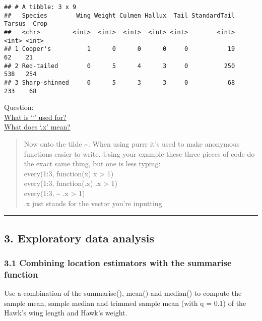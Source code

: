 \documentclass[
]{article}
\begin{document}
\begin{verbatim}
## # A tibble: 3 x 9
##   Species        Wing Weight Culmen Hallux  Tail StandardTail Tarsus  Crop
##   <chr>         <int>  <int>  <int>  <int> <int>        <int>  <int> <int>
## 1 Cooper's          1      0      0      0     0           19     62    21
## 2 Red-tailed        0      5      4      3     0          250    538   254
## 3 Sharp-shinned     0      5      3      3     0           68    233    68
\end{verbatim}

Question:\\
\href{https://purrr.tidyverse.org/articles/other-langs.html}{What is ``'
used for?}\\
\href{https://www.reddit.com/r/Rlanguage/comments/hcp4j7/what_does_x_and_p_mean_when_writing_functions/}{What
does `.x' mean?}

\begin{quote}
Now onto the tilde \textasciitilde. When using purrr it's used to make
anonymous functions easier to write. Using your example these three
pieces of code do the exact same thing, but one is less typing:\\
every(1:3, function(x) x \textgreater{} 1)\\
every(1:3, function(.x) .x \textgreater{} 1)\\
every(1:3, \textasciitilde{} .x \textgreater{} 1)\\
.x just stands for the vector you're inputting
\end{quote}

\begin{center}\rule{0.5\linewidth}{0.5pt}\end{center}

\hypertarget{exploratory-data-analysis}{%
\subsection{3. Exploratory data
analysis}\label{exploratory-data-analysis}}

\hypertarget{combining-location-estimators-with-the-summarise-function}{%
\subsubsection{3.1 Combining location estimators with the summarise
function}\label{combining-location-estimators-with-the-summarise-function}}

Use a combination of the summarise(), mean() and median() to compute the
sample mean, sample median and trimmed sample mean (with q = 0.1) of the
Hawk's wing length and Hawk's weight.
\end{document}
